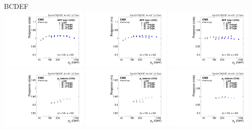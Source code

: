 \documentclass[landscape,10pt]{beamer} %
\begin{document}
\newpage
  BCDEF \\
  \includegraphics[width=0.32\textwidth]{BCDEF/paper_softrad_data_mpfchs1_vspt.pdf}
  \includegraphics[width=0.32\textwidth]{BCDEF/paper_softrad_mc_mpfchs1_vspt.pdf}
  \includegraphics[width=0.32\textwidth]{BCDEF/paper_softrad_ratio_mpfchs1_vspt.pdf}\\
  \includegraphics[width=0.32\textwidth]{BCDEF/paper_softrad_data_ptchs_vspt.pdf}
  \includegraphics[width=0.32\textwidth]{BCDEF/paper_softrad_mc_ptchs_vspt.pdf}
  \includegraphics[width=0.32\textwidth]{BCDEF/paper_softrad_ratio_ptchs_vspt.pdf}\\
\end{document}
